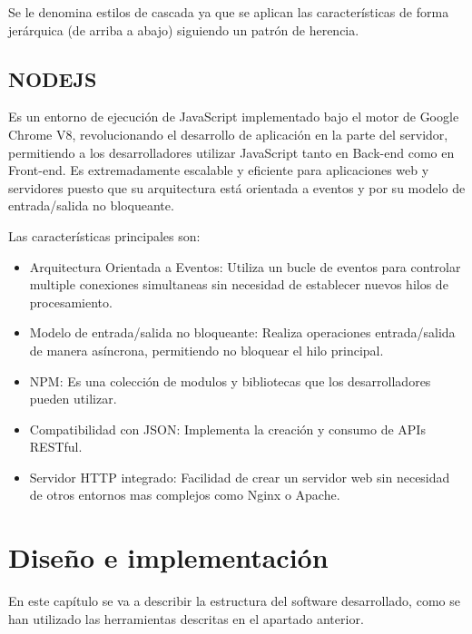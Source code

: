 \documentclass[a4paper, 12pt]{book}
\begin{document}
Se le denomina estilos de cascada ya que se aplican las características de forma jerárquica (de arriba a abajo) siguiendo un patrón de herencia.

\section{NODEJS}

Es un entorno de ejecución de JavaScript implementado bajo el motor de Google Chrome V8, revolucionando el desarrollo de aplicación en la parte del servidor, permitiendo a los desarrolladores utilizar JavaScript tanto en Back-end como en Front-end. Es extremadamente escalable y eficiente para aplicaciones web y servidores puesto que su arquitectura está orientada a eventos y por su modelo de entrada/salida no bloqueante.

Las características principales son:

\begin{itemize}
    \item Arquitectura Orientada a Eventos: Utiliza un bucle de eventos para controlar multiple conexiones simultaneas sin necesidad de establecer nuevos hilos de procesamiento.
    \item Modelo de entrada/salida no bloqueante: Realiza operaciones entrada/salida de manera asíncrona, permitiendo no bloquear el hilo principal.
    \item NPM: Es una colección de modulos y bibliotecas que los desarrolladores pueden utilizar.
    \item Compatibilidad con JSON: Implementa la creación y consumo de APIs RESTful.
    \item Servidor HTTP integrado: Facilidad de crear un servidor web sin necesidad de otros entornos mas complejos como Nginx o Apache.
\end{itemize}


\cleardoublepage
\chapter{Diseño e implementación}
\label{sec:diseno}

En este capítulo se va a describir la estructura del software desarrollado, como se han utilizado las herramientas descritas en el apartado anterior.
\end{document}
